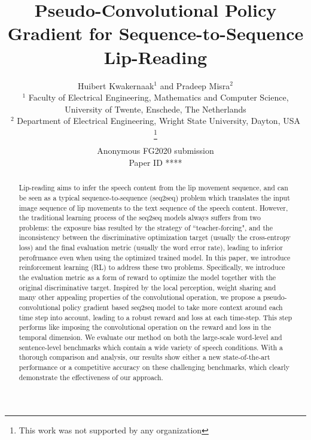 \documentclass[a4paper, 10pt, conference]{ieeeconf}      %
\title{\LARGE \bf Pseudo-Convolutional Policy Gradient for Sequence-to-Sequence Lip-Reading
}
\author{\parbox{16cm}{\centering
		{\large Huibert Kwakernaak$^1$ and Pradeep Misra$^2$}\\
		{\normalsize
			$^1$ Faculty of Electrical Engineering, Mathematics and Computer Science, University of Twente, Enschede, The Netherlands\\
			$^2$ Department of Electrical Engineering, Wright State University, Dayton, USA}}
	\thanks{This work was not supported by any organization}%
}
\def\FGPaperID{****} %
\begin{document}
	
	\ifFGfinal
	\thispagestyle{empty}
	\pagestyle{empty}
	\else
	\author{Anonymous FG2020 submission\\ Paper ID \FGPaperID \\}
	\pagestyle{plain}
	\fi
	\maketitle
	
	
	
	\begin{abstract}
		Lip-reading aims to infer the speech content from the lip movement sequence, and can be seen as a typical sequence-to-sequence (seq2seq) problem which translates the input image sequence of lip	movements to the text sequence of the speech content.
		However, the traditional learning process of the seq2seq models always suffers from two problems: the exposure bias resulted by the strategy of ``teacher-forcing", and the inconsistency between the discriminative optimization target (usually the cross-entropy loss) and the final evaluation metric (usually the word error rate), leading to inferior perofrmance even when using the optimized trained model. 
		In this paper, we introduce reinforcement learning (RL) to address these two problems. Specifically, we introduce the evaluation metric as a form of reward to optimize the model together with the original discriminative target. Inspired by the local perception, weight sharing and many other appealing properties of the convolutional operation, we propose a pseudo-convolutional policy gradient based seq2seq model to take more context around each time step into account, leading to a robust reward and loss at each time-step. This step performs like imposing the convolutional operation on the reward and loss in the temporal dimension. %
		We evaluate our method on both the large-scale word-level and sentence-level benchmarks which contain a wide variety of speech conditions. With a thorough comparison and analysis, our results show either a new state-of-the-art performance or a competitive accuracy on these challenging benchmarks, which clearly demonstrate the effectiveness of our approach.
	\end{abstract}
	
\end{document}
